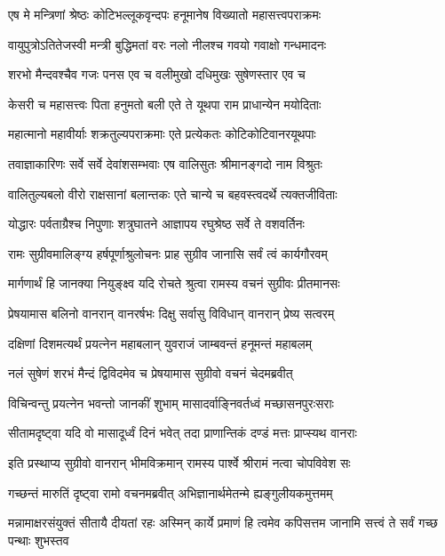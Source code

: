 \twolineshloka
{एष मे मन्त्रिणां श्रेष्ठः कोटिभल्लूकवृन्दपः}
{हनूमानेष विख्यातो महासत्त्वपराक्रमः} %

\twolineshloka
{वायुपुत्रोऽतितेजस्वी मन्त्री बुद्धिमतां वरः}
{नलो नीलश्च गवयो गवाक्षो गन्धमादनः} %

\twolineshloka
{शरभो मैन्दवश्चैव गजः पनस एव च}
{वलीमुखो दधिमुखः सुषेणस्तार एव च} %

\twolineshloka
{केसरी च महासत्त्वः पिता हनुमतो बली}
{एते ते यूथपा राम प्राधान्येन मयोदिताः} %

\twolineshloka
{महात्मानो महावीर्याः शक्रतुल्यपराक्रमाः}
{एते प्रत्येकतः कोटिकोटिवानरयूथपाः} %

\twolineshloka
{तवाज्ञाकारिणः सर्वे सर्वे देवांशसम्भवाः}
{एष वालिसुतः श्रीमानङ्गदो नाम विश्रुतः} %

\twolineshloka
{वालितुल्यबलो वीरो राक्षसानां बलान्तकः}
{एते चान्ये च बहवस्त्वदर्थे त्यक्तजीविताः} %

\twolineshloka
{योद्धारः पर्वताग्रैश्च निपुणाः शत्रुघातने}
{आज्ञापय रघुश्रेष्ठ सर्वे ते वशवर्तिनः} %

\twolineshloka
{रामः सुग्रीवमालिङ्ग्य हर्षपूर्णाश्रुलोचनः}
{प्राह सुग्रीव जानासि सर्वं त्वं कार्यगौरवम्} %

\twolineshloka
{मार्गणार्थं हि जानक्या नियुङ्क्ष्व यदि रोचते}
{श्रुत्वा रामस्य वचनं सुग्रीवः प्रीतमानसः} %

\twolineshloka
{प्रेषयामास बलिनो वानरान् वानरर्षभः}
{दिक्षु सर्वासु विविधान् वानरान् प्रेष्य सत्वरम्} %

\twolineshloka
{दक्षिणां दिशमत्यर्थं प्रयत्नेन महाबलान्}
{युवराजं जाम्बवन्तं हनूमन्तं महाबलम्} %

\twolineshloka
{नलं सुषेणं शरभं मैन्दं द्विविदमेव च}
{प्रेषयामास सुग्रीवो वचनं चेदमब्रवीत्} %

\twolineshloka
{विचिन्वन्तु प्रयत्नेन भवन्तो जानकीं शुभाम्}
{मासादर्वाङ्निवर्तध्वं मच्छासनपुरःसराः} %

\twolineshloka
{सीतामदृष्ट्वा यदि वो मासादूर्ध्वं दिनं भवेत्}
{तदा प्राणान्तिकं दण्डं मत्तः प्राप्स्यथ वानराः} %

\twolineshloka
{इति प्रस्थाप्य सुग्रीवो वानरान् भीमविक्रमान्}
{रामस्य पार्श्वे श्रीरामं नत्वा चोपविवेश सः} %

\twolineshloka
{गच्छन्तं मारुतिं दृष्ट्वा रामो वचनमब्रवीत्}
{अभिज्ञानार्थमेतन्मे ह्यङ्गुलीयकमुत्तमम्} %

\threelineshloka
{मन्नामाक्षरसंयुक्तं सीतायै दीयतां रहः}
{अस्मिन् कार्ये प्रमाणं हि त्वमेव कपिसत्तम}
{जानामि सत्त्वं ते सर्वं गच्छ पन्थाः शुभस्तव} %

